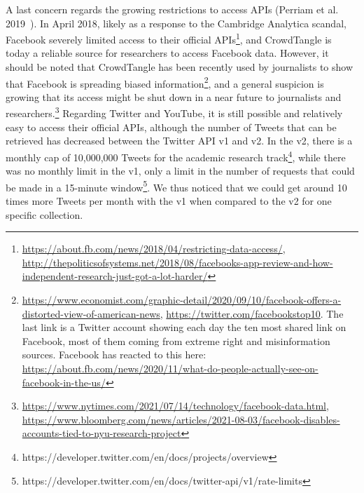 \documentclass{article}
\begin{document}
\smallskip

A last concern regards the growing restrictions to access APIs (Perriam et al. 2019~\cite{api}).
In April 2018, likely as a response to the Cambridge Analytica scandal, Facebook severely limited access to their official APIs\footnote{\url{https://about.fb.com/news/2018/04/restricting-data-access/}, \url{http://thepoliticsofsystems.net/2018/08/facebooks-app-review-and-how-independent-research-just-got-a-lot-harder/}}, 
and CrowdTangle is today a reliable source for researchers to access Facebook data. 
However, it should be noted that CrowdTangle has been recently used by journalists to show that Facebook is spreading biased information\footnote{\url{https://www.economist.com/graphic-detail/2020/09/10/facebook-offers-a-distorted-view-of-american-news}, \url{https://twitter.com/facebookstop10}. 
The last link is a Twitter account showing each day the ten most shared link on Facebook, most of them coming from extreme right and misinformation sources. 
Facebook has reacted to this here: \url{https://about.fb.com/news/2020/11/what-do-people-actually-see-on-facebook-in-the-us/}}, 
and a general suspicion is growing that its access might be shut down in a near future to journalists and researchers.\footnote{\url{https://www.nytimes.com/2021/07/14/technology/facebook-data.html}, \url{https://www.bloomberg.com/news/articles/2021-08-03/facebook-disables-accounts-tied-to-nyu-research-project}}
Regarding Twitter and YouTube, it is still possible and relatively easy to access their official APIs, although the number of Tweets that can be retrieved has decreased between the Twitter API v1 and v2. 
In the v2, there is a monthly cap of 10,000,000 Tweets for the academic research track\footnote{https://developer.twitter.com/en/docs/projects/overview},
while there was no monthly limit in the v1, only a limit in the number of requests that could be made in a 15-minute window\footnote{https://developer.twitter.com/en/docs/twitter-api/v1/rate-limits}.
We thus noticed that we could get around 10 times more Tweets per month with the v1 when compared to the v2 for one specific collection.

\smallskip
\end{document}
